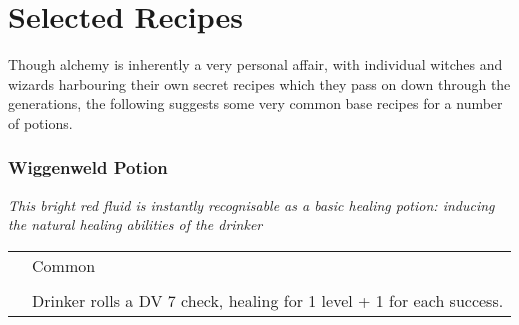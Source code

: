 \section{Selected Recipes}

Though alchemy is inherently a very personal affair, with individual witches and wizards harbouring their own secret recipes which they pass on down through the generations, the following suggests some very common base recipes for a number of potions. 



\newcommand\potion[5]
{
	\subsubsection{#1}
	
	{\it #2}
	
	\begin{tabular}{l p{5cm}}
		\key{Rarity:}	& #3
		\\
		\key{Ingredients:}	& \imp{#4}
		\\
		\key{Effect:}	& #5
	\end{tabular}
}

\potion{Wiggenweld Potion}{This bright red fluid is instantly recognisable as a basic healing potion: inducing the natural healing abilities of the drinker}{Common}{Wiggenweld Bark, Horklump Juice, Dittany}{Drinker rolls a DV 7 \imp{Vitality} check, healing for 1 level + 1 for each success.} 
